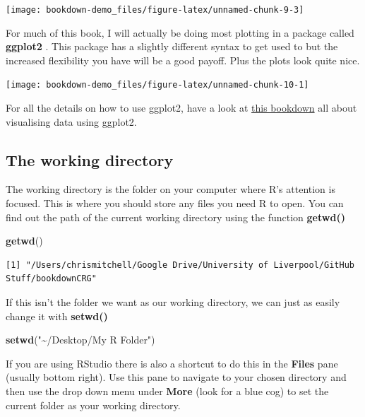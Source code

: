 \documentclass[
]{book}
\newenvironment{Shaded}{\begin{snugshade}}{\end{snugshade}}
\newcommand{\KeywordTok}[1]{\textcolor[rgb]{0.13,0.29,0.53}{\textbf{#1}}}
\newcommand{\NormalTok}[1]{#1}
\newcommand{\StringTok}[1]{\textcolor[rgb]{0.31,0.60,0.02}{#1}}
\begin{document}
\begin{center}\texttt{[image: bookdown-demo\_files/figure-latex/unnamed-chunk-9-3]} \end{center}

For much of this book, I will actually be doing most plotting in a package called \textbf{ggplot2} \citep{ggplot}. This package has a slightly different syntax to get used to but the increased flexibility you have will be a good payoff. Plus the plots look quite nice.

\begin{center}\texttt{[image: bookdown-demo\_files/figure-latex/unnamed-chunk-10-1]} \end{center}

For all the details on how to use ggplot2, have a look at \href{https://ggplot2.tidyverse.org}{this bookdown} all about visualising data using ggplot2.

\hypertarget{the-working-directory}{%
\subsection{The working directory}\label{the-working-directory}}

The working directory is the folder on your computer where R's attention is focused. This is where you should store any files you need R to open. You can find out the path of the current working directory using the function \textbf{getwd()}

\begin{Shaded}
\begin{Highlighting}[]
\KeywordTok{getwd}\NormalTok{()}
\end{Highlighting}
\end{Shaded}

\begin{verbatim}
[1] "/Users/chrismitchell/Google Drive/University of Liverpool/GitHub Stuff/bookdownCRG"
\end{verbatim}

If this isn't the folder we want as our working directory, we can just as easily change it with \textbf{setwd()}

\begin{Shaded}
\begin{Highlighting}[]
\KeywordTok{setwd}\NormalTok{(}\StringTok{"\textasciitilde{}/Desktop/My R Folder"}\NormalTok{)}
\end{Highlighting}
\end{Shaded}

If you are using RStudio there is also a shortcut to do this in the \textbf{Files} pane (usually bottom right). Use this pane to navigate to your chosen directory and then use the drop down menu under \textbf{More} (look for a blue cog) to set the current folder as your working directory.
\end{document}
